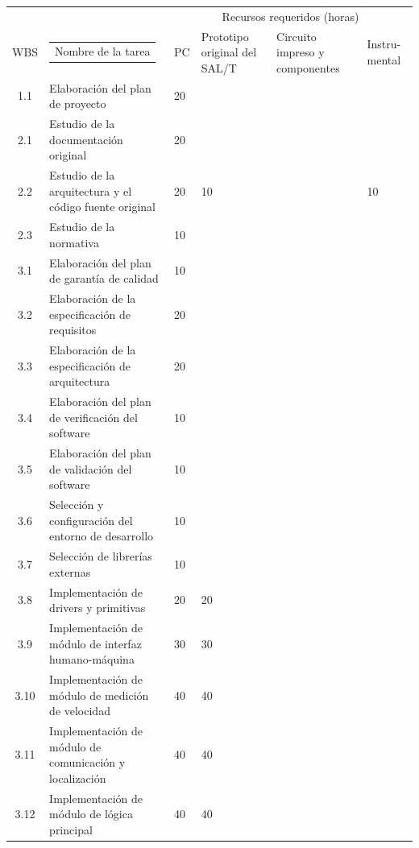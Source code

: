 \documentclass[11pt]{charter}
\begin{document}
\begin{table}[!htpb]
\begin{center}
  \begin{tabularx}{\linewidth}{@{}|c|X|m{0.8cm}|m{1.4cm}|m{1.3cm}|m{1.1cm}|@{}}
  \hline
  \cellcolor[HTML]{C0C0C0} & \cellcolor[HTML]{C0C0C0} & \multicolumn{4}{c|}{\cellcolor[HTML]{C0C0C0}Recursos requeridos (horas)} \\ \cline{3-6} 
  \multirow{-2}{*}{\cellcolor[HTML]{C0C0C0}WBS} & \multirow{-2}{*}{\cellcolor[HTML]{C0C0C0}\begin{tabular}[c]{@{}c@{}}Nombre de la tarea\end{tabular}} & PC & Prototipo original del SAL/T & Circuito impreso y componentes & Instru- mental \\ \hline
  1.1 & Elaboración del plan de proyecto & 20 & & & \\ \hline
  2.1 & Estudio de la documentación original & 20 & & & \\ \hline
  2.2 & Estudio de la arquitectura y el código fuente original & 20 & 10 & & 10 \\ \hline
  2.3 & Estudio de la normativa & 10 & & & \\ \hline
  3.1 & Elaboración del plan de garantía de calidad & 10 & & & \\  \hline
  3.2 & Elaboración de la especificación de requisitos & 20 & & & \\ \hline
  3.3 & Elaboración de la especificación de arquitectura & 20 & & & \\ \hline
  3.4 & Elaboración del plan de verificación del software & 10 & & & \\ \hline
  3.5 & Elaboración del plan de validación del software & 10 & & & \\ \hline
  3.6 & Selección y configuración del entorno de desarrollo & 10 & & & \\ \hline
  3.7 & Selección de librerías externas & 10 & & & \\ \hline
  3.8 & Implementación de drivers y primitivas & 20 & 20 & & \\ \hline
  3.9 & Implementación de módulo de interfaz humano-máquina & 30 & 30 & & \\ \hline
  3.10 & Implementación de módulo de medición de velocidad & 40 & 40 & & \\ \hline
  3.11 & Implementación de módulo de comunicación y localización & 40 & 40 & & \\ \hline
  3.12 & Implementación de módulo de lógica principal & 40 & 40 & & \\ \hline

\end{tabularx}
\end{center}
\end{table}
\end{document}

